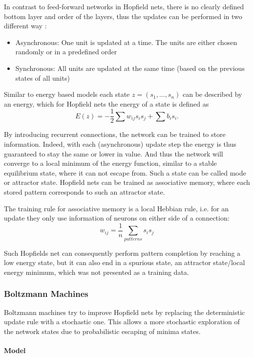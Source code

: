 In contrast to feed-forward networks in Hopfield nets, there is no clearly defined bottom layer and order of the layers, thus the updates can be performed in two different way :
\begin{itemize}
\item Asynchronous: One unit is updated at a time. The units are either chosen randomly or in a predefined order
\item Synchronous: All units are updated at the same time (based on the previous states of all units)
\end{itemize}

Similar to energy based models each state $z = (s_1, ... , s_n)$ can be described by an energy, which for Hopfield nets the energy of a state is defined as  
\[
E(z) = - \frac{1}{2} \sum w_{ij} s_i s_j + \sum b_i s_i .
\]


By introducing recurrent connections, the network can be trained to store information.
Indeed, with each (asynchronous) update step the energy is thus guaranteed to stay the same or lower in value.
And thus the network will converge to a local minimum of the energy function, similar to a stable equilibrium state, where it can not escape from. 
Such a state can be called mode or attractor state.
Hopfield nets can be trained as associative memory, where each stored pattern corresponds to such an attractor state.

The training rule for associative memory is a local Hebbian rule, i.e. for an update they only use information of neurons on either side of a connection:
\[
w_{ij} = \frac{1}{n} \sum_{patterns} s_{i} s_{j}
\]

Such Hopfields net can consequently perform pattern completion by reaching a low energy state, but it can also end in a spurious state, an attractor state/local energy minimum, which was not presented as a training data.


\subsubsection{Boltzmann Machines}

Boltzmann machines try to improve Hopfield nets by replacing the deterministic update rule with a stochastic one.
This allows a more stochastic exploration of the network states due to probabilistic escaping of minima states.

\paragraph{Model}

